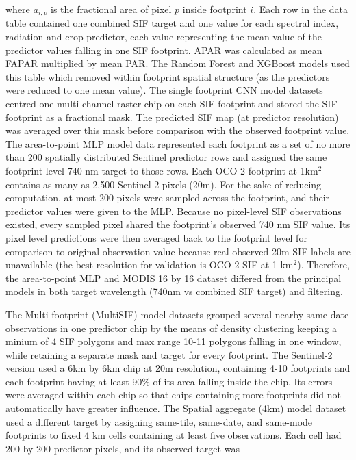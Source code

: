 where $a_{i,p}$ is the fractional area of pixel $p$ inside footprint $i$. Each row in the data table contained one combined SIF target and one value for each spectral index, radiation and crop predictor, each value representing the mean value of the predictor values falling in one SIF footprint. APAR was calculated as mean FAPAR multiplied by mean PAR. The Random Forest and XGBoost models used this table which removed within footprint spatial structure (as the predictors were reduced to one mean value). The single footprint CNN model datasets centred one multi-channel raster chip on each SIF footprint and stored the SIF footprint as a fractional mask. The predicted SIF map (at predictor resolution) was averaged over this mask before comparison with the observed footprint value. The area-to-point MLP model data represented each footprint as a set of no more than 200 spatially distributed Sentinel predictor rows and assigned the same footprint level 740 nm target to those rows. Each OCO-2 footprint at 1km$^2$ contains as many as 2,500 Sentinel-2 pixels (20m). For the sake of reducing computation, at most 200 pixels were sampled across the footprint, and their predictor values were given to the MLP. Because no pixel-level SIF observations existed, every sampled pixel shared the footprint’s observed 740 nm SIF value. Its pixel level predictions were then averaged back to the footprint level for comparison to original observation value because real observed 20m SIF labels are unavailable (the best resolution for validation is OCO-2 SIF at 1 km$^2$). Therefore, the area-to-point MLP and MODIS 16 by 16 dataset differed from the principal models in both target wavelength (740nm vs combined SIF target) and filtering.

The Multi-footprint (MultiSIF) model datasets grouped several nearby same-date observations in one predictor chip by the means of density clustering keeping a minium of 4 SIF polygons and max range 10-11 polygons falling in one window, while retaining a separate mask and target for every footprint. The Sentinel-2 version used a 6km by 6km chip at 20m resolution, containing 4-10 footprints and each footprint having at least 90\% of its area falling inside the chip. Its errors were averaged within each chip so that chips containing more footprints did not automatically have greater influence. The Spatial aggregate (4km) model dataset used a different target by assigning same-tile, same-date, and same-mode footprints to fixed 4 km cells containing at least five observations. Each cell had 200 by 200 predictor pixels, and its observed target was

